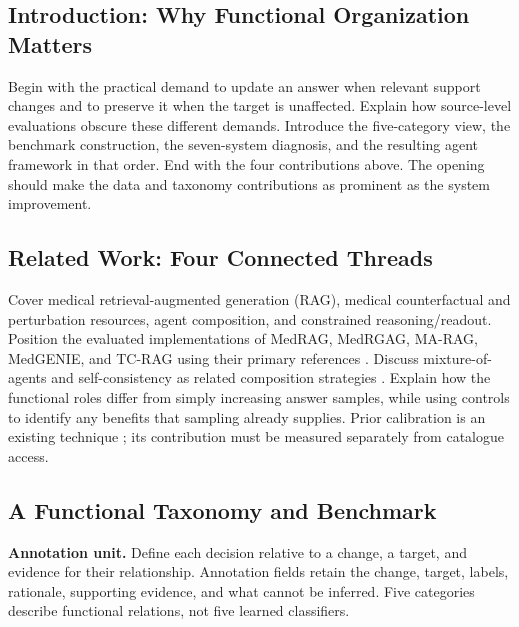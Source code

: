 \documentclass[11pt,a4paper]{article}
\begin{document}
\subsection{Introduction: Why Functional Organization Matters}
Begin with the practical demand to update an answer when relevant support changes and to preserve it when the target is unaffected. Explain how source-level evaluations obscure these different demands. Introduce the five-category view, the benchmark construction, the seven-system diagnosis, and the resulting agent framework in that order. End with the four contributions above. The opening should make the data and taxonomy contributions as prominent as the system improvement.

\subsection{Related Work: Four Connected Threads}
Cover medical retrieval-augmented generation (RAG), medical counterfactual and perturbation resources, agent composition, and constrained reasoning/readout. Position the evaluated implementations of MedRAG, MedRGAG, MA-RAG, MedGENIE, and TC-RAG using their primary references \citep{xiong2024medrag,li2026medrgag,wu2026marag,frisoni2024medgenie,jiang2025tcrag}. Discuss mixture-of-agents and self-consistency as related composition strategies \citep{wang2025moa,wang2023selfconsistency}. Explain how the functional roles differ from simply increasing answer samples, while using controls to identify any benefits that sampling already supplies. Prior calibration is an existing technique \citep{zhao2021calibrate}; its contribution must be measured separately from catalogue access.

\subsection{A Functional Taxonomy and Benchmark}
\textbf{Annotation unit.} Define each decision relative to a change, a target, and evidence for their relationship. Annotation fields retain the change, target, labels, rationale, supporting evidence, and what cannot be inferred. Five categories describe functional relations, not five learned classifiers.
\end{document}
